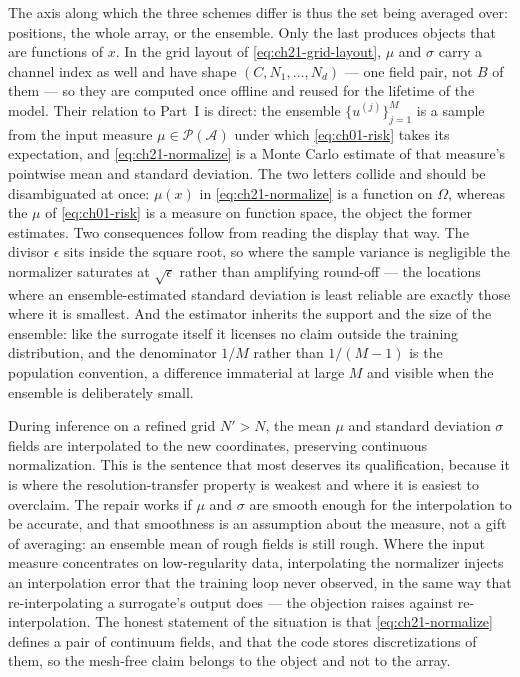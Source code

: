 The axis along which the three schemes differ is thus the set being averaged over:
positions, the whole array, or the ensemble. Only the last produces objects that are
functions of $x$. In the grid layout of \eqref{eq:ch21-grid-layout}, $\mu$ and $\sigma$
carry a channel index as well and have shape $(C, N_1, \dots, N_d)$ --- one field pair, not
$B$ of them --- so they are computed once offline and reused for the lifetime of the
model. Their relation to Part~I is direct: the ensemble $\{u^{(j)}\}_{j=1}^{M}$ is a
sample from the input measure $\mu \in \mathcal{P}(\mathcal{A})$ under which
\eqref{eq:ch01-risk} takes its expectation, and \eqref{eq:ch21-normalize} is a Monte
Carlo estimate of that measure's pointwise mean and standard deviation. The two letters
collide and should be disambiguated at once: $\mu(x)$ in \eqref{eq:ch21-normalize} is a
function on $\Omega$, whereas the $\mu$ of \eqref{eq:ch01-risk} is a measure on function
space, the object the former estimates. Two consequences
follow from reading the display that way. The divisor $\epsilon$ sits inside the square
root, so where the sample variance is negligible the normalizer saturates at
$\sqrt{\epsilon}$ rather than amplifying round-off --- the locations where an
ensemble-estimated standard deviation is least reliable are exactly those where it is
smallest. And the estimator inherits the support and the size of the ensemble: like the
surrogate itself it licenses no claim outside the training distribution, and the
denominator $1/M$ rather than $1/(M-1)$ is the population convention, a difference
immaterial at large $M$ and visible when the ensemble is deliberately small.

During inference on a refined grid $N' > N$, the mean $\mu$ and standard deviation
$\sigma$ fields are interpolated to the new coordinates, preserving continuous
normalization. This is the sentence that most deserves its qualification, because it is
where the resolution-transfer property is weakest and where it is easiest to overclaim.
The repair works if $\mu$ and $\sigma$ are smooth enough for the interpolation to be
accurate, and that smoothness is an assumption about the measure, not a gift of
averaging: an ensemble mean of rough fields is still rough. Where the input measure
concentrates on low-regularity data, interpolating the normalizer injects an
interpolation error that the training loop never observed, in the same way that
re-interpolating a surrogate's output does --- the objection
 raises against
re-interpolation. The honest statement of the situation is that
\eqref{eq:ch21-normalize} defines a pair of continuum fields, and that the code stores
discretizations of them, so the mesh-free claim belongs to the object and not to the
array. 

